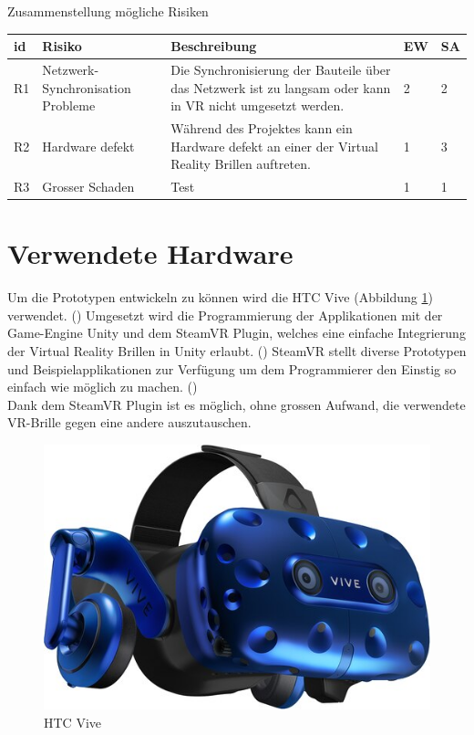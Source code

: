 Zusammenstellung mögliche Risiken
\begin{center}
	\begin{tabularx}{\textwidth} { |l|l|B|l|l| }
		\hline
		\color{white} \textbf{id} & \color{white} \textbf{Risiko} & \color{white} \textbf{Beschreibung} & \color{white} \textbf{EW} & \color{white} \textbf{SA} \\
		\hline
		R1 & Netzwerk-Synchronisation Probleme & Die Synchronisierung der Bauteile über das Netzwerk ist zu langsam oder kann in VR nicht umgesetzt werden. & 2 & 2 \\
		\hline
		R2 & Hardware defekt & Während des Projektes kann ein Hardware defekt an einer der Virtual Reality Brillen auftreten. & 1 & 3 \\
		\hline
		R3 & Grosser Schaden & Test & 1 & 1 \\
		\hline
	\end{tabularx}
\end{center}
\label{tbl:risiken_vorher}



\section{Verwendete Hardware}
Um die Prototypen entwickeln zu können wird die HTC Vive (Abbildung \ref{fig:htc_vive}) verwendet. (\cite{noauthor_vive_2019}) Umgesetzt wird die Programmierung der Applikationen mit der Game-Engine Unity und dem SteamVR Plugin, welches eine einfache Integrierung der Virtual Reality Brillen in Unity erlaubt. (\cite{noauthor_unity_2019}) SteamVR stellt diverse Prototypen und Beispielapplikationen zur Verfügung um dem Programmierer den Einstig so einfach wie möglich zu machen. (\cite{noauthor_steamvr_2019})\\
Dank dem SteamVR Plugin ist es möglich, ohne grossen Aufwand, die verwendete VR-Brille gegen eine andere auszutauschen.
\begin{figure}[h!]
	\centering
	\includegraphics[keepaspectratio,width=0.4\linewidth]{img/Vive_Pro.jpg}
	\caption{HTC Vive}
	\label{fig:htc_vive}
\end{figure}